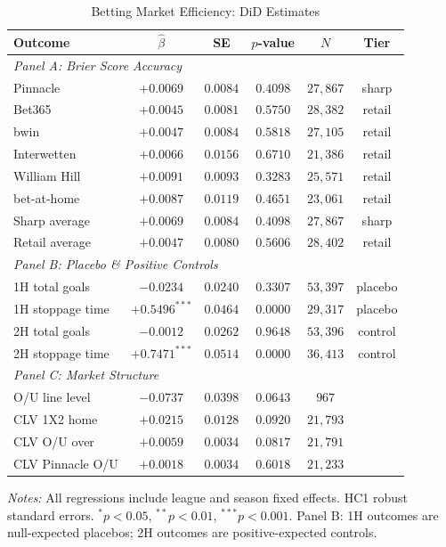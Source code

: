 \begin{table}[htbp]
\centering
\caption{Betting Market Efficiency: DiD Estimates}
\label{tab:betting_efficiency_v3}
\small
\begin{threeparttable}
\begin{tabular}{lccccc}
\toprule
Outcome & $\hat{\beta}$ & SE & $p$-value & $N$ & Tier \\
\midrule
\multicolumn{6}{l}{\textit{Panel A: Brier Score Accuracy}} \\
\quad Pinnacle & $+0.0069$ & $0.0084$ & $0.4098$ & $27,867$ & sharp \\
\quad Bet365 & $+0.0045$ & $0.0081$ & $0.5750$ & $28,382$ & retail \\
\quad bwin & $+0.0047$ & $0.0084$ & $0.5818$ & $27,105$ & retail \\
\quad Interwetten & $+0.0066$ & $0.0156$ & $0.6710$ & $21,386$ & retail \\
\quad William Hill & $+0.0091$ & $0.0093$ & $0.3283$ & $25,571$ & retail \\
\quad bet-at-home & $+0.0087$ & $0.0119$ & $0.4651$ & $23,061$ & retail \\
\quad Sharp average & $+0.0069$ & $0.0084$ & $0.4098$ & $27,867$ & sharp \\
\quad Retail average & $+0.0047$ & $0.0080$ & $0.5606$ & $28,402$ & retail \\
\midrule
\multicolumn{6}{l}{\textit{Panel B: Placebo \& Positive Controls}} \\
\quad 1H total goals & $-0.0234$ & $0.0240$ & $0.3307$ & $53,397$ & placebo \\
\quad 1H stoppage time & $+0.5496^{***}$ & $0.0464$ & $0.0000$ & $29,317$ & placebo \\
\quad 2H total goals & $-0.0012$ & $0.0262$ & $0.9648$ & $53,396$ & control \\
\quad 2H stoppage time & $+0.7471^{***}$ & $0.0514$ & $0.0000$ & $36,413$ & control \\
\midrule
\multicolumn{6}{l}{\textit{Panel C: Market Structure}} \\
\quad O/U line level & $-0.0737$ & $0.0398$ & $0.0643$ & $967$ & \\
\quad CLV 1X2 home & $+0.0215$ & $0.0128$ & $0.0920$ & $21,793$ & \\
\quad CLV O/U over & $+0.0059$ & $0.0034$ & $0.0817$ & $21,791$ & \\
\quad CLV Pinnacle O/U & $+0.0018$ & $0.0034$ & $0.6018$ & $21,233$ & \\
\bottomrule
\end{tabular}
\begin{tablenotes}
\small
\item \textit{Notes:} All regressions include league and season fixed effects.
HC1 robust standard errors. $^{*}p<0.05$, $^{**}p<0.01$, $^{***}p<0.001$.
Panel B: 1H outcomes are null-expected placebos; 2H outcomes are positive-expected controls.
\end{tablenotes}
\end{threeparttable}
\end{table}
